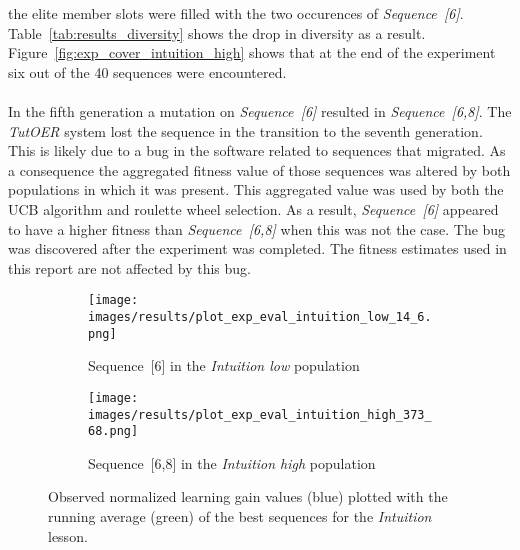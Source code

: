 the elite member slots were filled with the two occurences of
\emph{Sequence~[6]}. Table~\ref{tab:results_diversity} shows the drop in
diversity as a result. Figure~\ref{fig:exp_cover_intuition_high} shows that at
the end of the experiment six out of the 40 sequences were encountered.\\\\
\noindent
In the fifth generation a mutation on \emph{Sequence~[6]} resulted in
\emph{Sequence~[6,8]}. The \emph{TutOER} system lost the sequence in the
transition to the seventh generation. This is likely due to a bug in the
software related to sequences that migrated. As a consequence the aggregated
fitness value of those sequences was altered by both populations in which it
was present. This aggregated value was used by both the UCB algorithm and
roulette wheel selection. As a result, \emph{Sequence~[6]} appeared to have a
higher fitness than \emph{Sequence~[6,8]} when this was not the case. The bug
was discovered after the experiment was completed. The fitness estimates used
in this report are not affected by this bug.

\begin{figure}[ht]
	\begin{subfigure}{0.9\linewidth}
	\centering
	\texttt{[image: images/results/plot\_exp\_eval\_intuition\_low\_14\_6.png]}
	\caption{Sequence~[6] in the \emph{Intuition low} population}
	\label{fig:exp_eval_intuition_low_14}
	\end{subfigure}
	\hfill
	\begin{subfigure}{0.9\linewidth}
	\centering
	\texttt{[image: images/results/plot\_exp\_eval\_intuition\_high\_373\_68.png]}
	\caption{Sequence~[6,8] in the \emph{Intuition high} population}
	\label{fig:exp_eval_intuition_high_373}
	\end{subfigure}
	\caption[Evaluations of best sequences in Intuition]{Observed normalized learning gain values (blue) plotted with the
		running average (green) of the best sequences for the \emph{Intuition}
	lesson.}
	\label{fig:exp_eval_intuition}
\end{figure}

